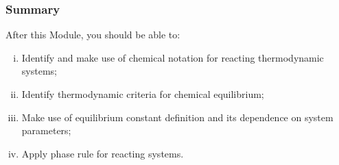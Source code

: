 \documentclass[10pt,compress,handout,unknownkeysallowed]{beamer}
\begin{document}
\begin{frame}
 \frametitle{Summary}
   After this Module, you should be able to:
   \begin{enumerate}[(i)]
     \item Identify and make use of chemical notation for reacting thermodynamic systems;
     \item Identify thermodynamic criteria for chemical equilibrium;
     \item Make use of equilibrium constant definition and its dependence on system parameters;
     \item Apply phase rule for reacting systems.
   \end{enumerate}
\end{frame}
\end{document}
